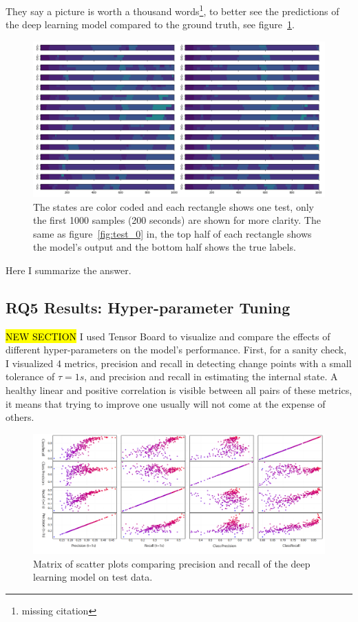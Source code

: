 They say a picture is worth a thousand words\footnote{missing citation}, to better see the predictions of the deep learning model compared to the ground truth, see figure~\ref{fig:paparazzi_predictions}. 
\begin{figure}
    \centering
    \includegraphics[width=\columnwidth]{RQ3-5_charts/states_chart.png}
    \caption{The states are color coded and each rectangle shows one test, only the first 1000 samples (200 seconds) are shown for more clarity. The same as figure~\ref{fig:test_0} in, the top half of each rectangle shows the model's output and the bottom half shows the true labels.}
    \label{fig:paparazzi_predictions}
\end{figure}


\begin{rqanswer}
Here I summarize the answer.
\end{rqanswer}

\subsection{RQ5 Results: Hyper-parameter Tuning}
\hl{NEW SECTION}
I used Tensor Board to visualize and compare the effects of different hyper-parameters on the model's performance. First, for a sanity check, I visualized 4 metrics, precision and recall in detecting change points with a small tolerance of $\tau=1s$, and precision and recall in estimating the internal state. A healthy linear and positive correlation is visible between all pairs of these metrics, it means that trying to improve one usually will not come at the expense of others. 
\begin{figure}
    \centering
    \includegraphics[width=\columnwidth]{RQ3-5_charts/prec_recall_matrix_tuning_white_background.png}
    \caption{Matrix of scatter plots comparing precision and recall of the deep learning model on test data.}
    \label{fig:precision_recall_matrix}
\end{figure}

